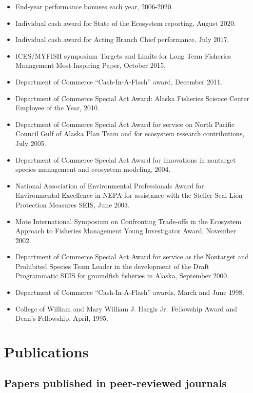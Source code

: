 \documentclass[11pt, a4paper]{awesome-cv}
\providecommand{\tightlist}{%
	\setlength{\itemsep}{0pt}\setlength{\parskip}{0pt}}
\begin{document}
\begin{itemize}
\tightlist
\item
  End-year performance bonuses each year, 2006-2020.
\item
  Individual cash award for State of the Ecosystem reporting, August
  2020.
\item
  Individual cash award for Acting Branch Chief performance, July 2017.
\item
  ICES/MYFISH symposium Targets and Limits for Long Term Fisheries
  Management Most Inspiring Paper, October 2015.
\item
  Department of Commerce ``Cash-In-A-Flash'' award, December 2011.
\item
  Department of Commerce Special Act Award: Alaska Fisheries Science
  Center Employee of the Year, 2010.
\item
  Department of Commerce Special Act Award for service on North Pacific
  Council Gulf of Alaska Plan Team and for ecosystem research
  contributions, July 2005.
\item
  Department of Commerce Special Act Award for innovations in nontarget
  species management and ecosystem modeling, 2004.
\item
  National Association of Environmental Professionals Award for
  Environmental Excellence in NEPA for assistance with the Steller Seal
  Lion Protection Measures SEIS, June 2003.
\item
  Mote International Symposium on Confronting Trade-offs in the
  Ecosystem Approach to Fisheries Management Young Investigator Award,
  November 2002.
\item
  Department of Commerce Special Act Award for service as the Nontarget
  and Prohibited Species Team Leader in the development of the Draft
  Programmatic SEIS for groundfish fisheries in Alaska, September 2000.
\item
  Department of Commerce ``Cash-In-A-Flash'' awards, March and June
  1998.
\item
  College of William and Mary William J. Hargis Jr.~Fellowship Award and
  Dean's Fellowship. April, 1995.
\end{itemize}

\hypertarget{publications}{%
\section{Publications}\label{publications}}

\hypertarget{papers-published-in-peer-reviewed-journals}{%
\subsection{Papers published in peer-reviewed
journals}\label{papers-published-in-peer-reviewed-journals}}
\end{document}
